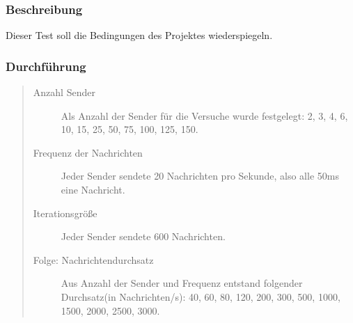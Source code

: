 \subsubsection{Beschreibung}
Dieser Test soll die Bedingungen des Projektes wiederspiegeln.



\subsubsection{Durchführung}
\begin{quote}
  \begin{description}
  \item[Anzahl Sender]
  Als Anzahl der Sender für die Versuche wurde festgelegt: 2, 3, 4, 6, 10, 15, 25, 50, 75, 100, 125, 150.
  
  \item[Frequenz der Nachrichten]
  Jeder Sender sendete 20 Nachrichten pro Sekunde, also alle 50ms eine Nachricht.
  
  \item[Iterationsgröße]
  Jeder Sender sendete 600 Nachrichten.
  
  \item[Folge: Nachrichtendurchsatz]
  Aus Anzahl der Sender und Frequenz entstand folgender Durchsatz(in Nachrichten/s): 40, 60, 80, 120, 200, 300, 500, 1000,     1500, 2000, 2500, 3000.
  \end{description}
\end{quote}



